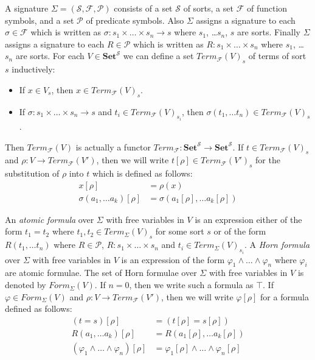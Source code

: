 \documentclass{amsart}
\theoremstyle{definition}
\theoremstyle{remark}
\newcommand{\cat}[1]{\mathbf{#1}}
\newcommand{\Set}{\cat{Set}}
\numberwithin{figure}{section}
\begin{document}
A signature $\Sigma = (\mathcal{S}, \mathcal{F}, \mathcal{P})$ consists of a set $\mathcal{S}$ of sorts, a set $\mathcal{F}$ of function symbols, and a set $\mathcal{P}$ of predicate symbols.
Also $\Sigma$ assigns a signature to each $\sigma \in \mathcal{F}$ which is written as $\sigma : s_1 \times \ldots \times s_n \to s$ where $s_1$, \ldots $s_n$, $s$ are sorts.
Finally $\Sigma$ assigns a signature to each $R \in \mathcal{P}$ which is written as $R : s_1 \times \ldots \times s_n$ where $s_1$, \ldots $s_n$ are sorts.
For each $V \in \Set^\mathcal{S}$ we can define a set $Term_\mathcal{F}(V)_s$ of terms of sort $s$ inductively:
\begin{itemize}
\item If $x \in V_s$, then $x \in Term_\mathcal{F}(V)_s$.
\item If $\sigma : s_1 \times \ldots \times s_n \to s$ and $t_i \in Term_\mathcal{F}(V)_{s_i}$, then $\sigma(t_1, \ldots t_n) \in Term_\mathcal{F}(V)_s$.
\end{itemize}
Then $Term_\mathcal{F}(V)$ is actually a functor $Term_\mathcal{F} : \Set^\mathcal{S} \to \Set^\mathcal{S}$.
If $t \in Term_\mathcal{F}(V)_s$ and $\rho : V \to Term_\mathcal{F}(V')$, then we will write $t[\rho] \in Term_\mathcal{F}(V')_s$
for the substitution of $\rho$ into $t$ which is defined as follows:
\begin{align*}
x[\rho] & = \rho(x) \\
\sigma(a_1, \ldots a_k)[\rho] & = \sigma(a_1[\rho], \ldots a_k[\rho])
\end{align*}

An \emph{atomic formula} over $\Sigma$ with free variables in $V$ is an expression either of the form $t_1 = t_2$ where $t_1, t_2 \in Term_\Sigma(V)_s$ for some sort $s$
or of the form $R(t_1, \ldots t_n)$ where $R \in \mathcal{P}$, $R : s_1 \times \ldots \times s_n$ and $t_i \in Term_\Sigma(V)_{s_i}$.
A \emph{Horn formula} over $\Sigma$ with free variables in $V$ is an expression of the form $\varphi_1 \land \ldots \land \varphi_n$ where $\varphi_i$ are atomic formulae.
The set of Horn formulae over $\Sigma$ with free variables in $V$ is denoted by $Form_\Sigma(V)$.
If $n = 0$, then we write such a formula as $\top$.
If $\varphi \in Form_\Sigma(V)$ and $\rho : V \to Term_\mathcal{F}(V')$, then we will write $\varphi[\rho]$ for a formula defined as follows:
\begin{align*}
(t = s)[\rho] & = (t[\rho] = s[\rho]) \\
R(a_1, \ldots a_k)[\rho] & = R(a_1[\rho], \ldots a_k[\rho]) \\
(\varphi_1 \land \ldots \land \varphi_n)[\rho] & = \varphi_1[\rho] \land \ldots \land \varphi_n[\rho]
\end{align*}
\end{document}
